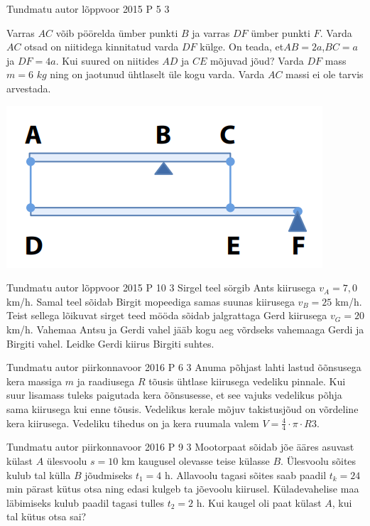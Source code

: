 \documentclass[11pt]{article}
\begin{document}
{%
{Tundmatu autor} %
{lõppvoor} %
{2015} %
{P 5} %
{3} %
{
\ifStatement
Varras $AC$ võib pöörelda ümber punkti $B$ ja varras $DF$ ümber punkti $F$. Varda $AC$ otsad on niitidega kinnitatud varda $DF$ külge. On teada, et$ AB = 2a$,$ BC = a$ ja $DF = 4a$. Kui suured on niitides $AD$ ja $CE$ mõjuvad jõud? Varda $DF$ mass $m = 6$ $kg$ ning on jaotunud ühtlaselt üle kogu varda. Varda $AC$ massi ei ole tarvis arvestada.
\begin{center}
	\includegraphics[width=0.5\linewidth]{2015-v3p-05-yl.PNG}
\end{center}
\fi
}

{Tundmatu autor} %
{lõppvoor} %
{2015} %
{P 10} %
{3} %
{
\ifStatement
 Sirgel teel sörgib Ants kiirusega $v_A = 7,0$ km/h. Samal teel sõidab Birgit mopeediga samas suunas kiirusega $v_B = 25$ km/h. Teist sellega lõikuvat sirget teed mööda sõidab jalgrattaga Gerd kiirusega $v_G = 20$ km/h. Vahemaa Antsu ja Gerdi vahel jääb kogu aeg võrdseks vahemaaga Gerdi ja Birgiti vahel. Leidke Gerdi kiirus Birgiti suhtes.
\fi
}

{Tundmatu autor} %
{piirkonnavoor} %
{2016} %
{P 6} %
{3} %
{
\ifStatement
Anuma põhjast lahti lastud õõnsusega kera massiga $m$ ja raadiusega $R$ tõusis ühtlase kiirusega vedeliku pinnale. Kui suur lisamass tuleks paigutada kera õõnsusesse, et see vajuks vedelikus põhja sama kiirusega kui enne tõusis. Vedelikus kerale mõjuv takistusjõud on võrdeline kera kiirusega. Vedeliku tihedus on  ja kera ruumala valem $V = \frac{4}{4} \cdot \pi \cdot R3$.
\fi
}

{Tundmatu autor} %
{piirkonnavoor} %
{2016} %
{P 9} %
{3} %
{
\ifStatement
Mootorpaat sõidab jõe ääres asuvast külast $A$ ülesvoolu $s = 10$ km kaugusel olevasse teise külasse $B$. Ülesvoolu sõites kulub tal külla $B$ jõudmiseks $t_1 = 4$ h. Allavoolu tagasi sõites saab paadil $t_k = 24$ min pärast kütus otsa ning edasi kulgeb ta jõevoolu kiirusel. Küladevahelise maa läbimiseks kulub paadil tagasi tulles $t_2 = 2$ h. Kui kaugel oli paat külast $A$, kui tal kütus otsa sai?
\fi
}

}
\end{document}
